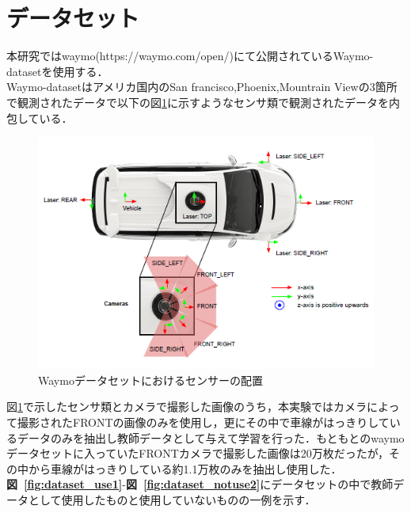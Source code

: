 \documentclass[a4j, 11pt]{jreport}
\newcommand{\figref}[1]{\textbf{図~\ref{#1}}}
\begin{document}
\section{データセット}
本研究ではwaymo(https://waymo.com/open/)にて公開されているWaymo-dataset\cite{waymo-web}\cite{waymo-paper}を使用する．\\
Waymo-datasetはアメリカ国内のSan francisco,Phoenix,Mountrain Viewの3箇所で観測されたデータで以下の図\ref{fig:waymo-sensor}に示すようなセンサ類で観測されたデータを内包している．
\begin{figure}[H]
	\centering
	\includegraphics[scale=0.5]{./images/datasets/waymo-sensors.png}
	\caption{Waymoデータセットにおけるセンサーの配置}
	\label{fig:waymo-sensor}
\end{figure}
図\ref{fig:waymo-sensor}で示したセンサ類とカメラで撮影した画像のうち，本実験ではカメラによって撮影されたFRONTの画像のみを使用し，更にその中で車線がはっきりしているデータのみを抽出し教師データとして与えて学習を行った．もともとのwaymoデータセットに入っていたFRONTカメラで撮影した画像は20万枚だったが，その中から車線がはっきりしている約1.1万枚のみを抽出し使用した．\\
\figref{fig:dataset_use1}-\figref{fig:dataset_notuse2}にデータセットの中で教師データとして使用したものと使用していないものの一例を示す．
\end{document}
